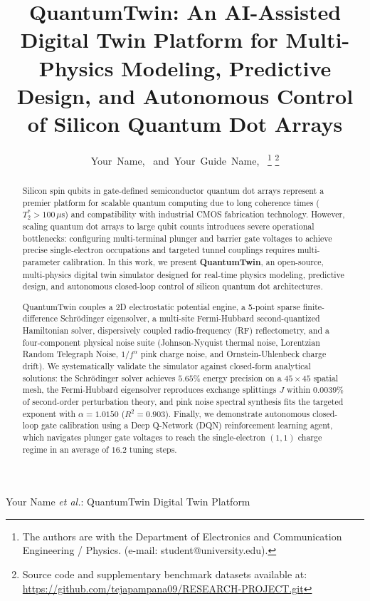 \documentclass[journal,twocolumn,10pt]{IEEEtran}
\begin{document}
\title{QuantumTwin: An AI-Assisted Digital Twin Platform for Multi-Physics Modeling, Predictive Design, and Autonomous Control of Silicon Quantum Dot Arrays}

\author{Your~Name,~
        and~Your~Guide~Name,~%
\thanks{The authors are with the Department of Electronics and Communication Engineering / Physics. (e-mail: student@university.edu).}%
\thanks{Source code and supplementary benchmark datasets available at: \url{https://github.com/tejapampana09/RESEARCH-PROJECT.git}}
}

%
{Your Name \MakeLowercase{\textit{et al.}}: QuantumTwin Digital Twin Platform}

\maketitle

\begin{abstract}
Silicon spin qubits in gate-defined semiconductor quantum dot arrays represent a premier platform for scalable quantum computing due to long coherence times ($T_2^* > 100\,\mu\text{s}$) and compatibility with industrial CMOS fabrication technology. However, scaling quantum dot arrays to large qubit counts introduces severe operational bottlenecks: configuring multi-terminal plunger and barrier gate voltages to achieve precise single-electron occupations and targeted tunnel couplings requires multi-parameter calibration. In this work, we present \textbf{QuantumTwin}, an open-source, multi-physics digital twin simulator designed for real-time physics modeling, predictive design, and autonomous closed-loop control of silicon quantum dot architectures. 

QuantumTwin couples a 2D electrostatic potential engine, a 5-point sparse finite-difference Schrödinger eigensolver, a multi-site Fermi-Hubbard second-quantized Hamiltonian solver, dispersively coupled radio-frequency (RF) reflectometry, and a four-component physical noise suite (Johnson-Nyquist thermal noise, Lorentzian Random Telegraph Noise, $1/f^\alpha$ pink charge noise, and Ornstein-Uhlenbeck charge drift). We systematically validate the simulator against closed-form analytical solutions: the Schrödinger solver achieves $5.65\%$ energy precision on a $45 \times 45$ spatial mesh, the Fermi-Hubbard eigensolver reproduces exchange splittings $J$ within $0.0039\%$ of second-order perturbation theory, and pink noise spectral synthesis fits the targeted exponent with $\alpha = 1.0150$ ($R^2 = 0.903$). Finally, we demonstrate autonomous closed-loop gate calibration using a Deep Q-Network (DQN) reinforcement learning agent, which navigates plunger gate voltages to reach the single-electron $(1,1)$ charge regime in an average of $16.2$ tuning steps.
\end{abstract}
\end{document}
